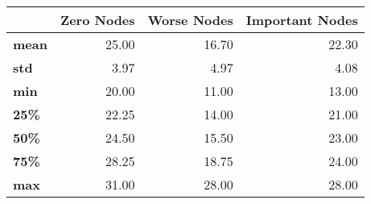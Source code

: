 \begin{tabular}{lrrr}
\toprule
{} &  Zero Nodes &  Worse Nodes &  Important Nodes \\
\midrule
\textbf{mean} &       25.00 &        16.70 &            22.30 \\
\textbf{std } &        3.97 &         4.97 &             4.08 \\
\textbf{min } &       20.00 &        11.00 &            13.00 \\
\textbf{25\% } &       22.25 &        14.00 &            21.00 \\
\textbf{50\% } &       24.50 &        15.50 &            23.00 \\
\textbf{75\% } &       28.25 &        18.75 &            24.00 \\
\textbf{max } &       31.00 &        28.00 &            28.00 \\
\bottomrule
\end{tabular}
